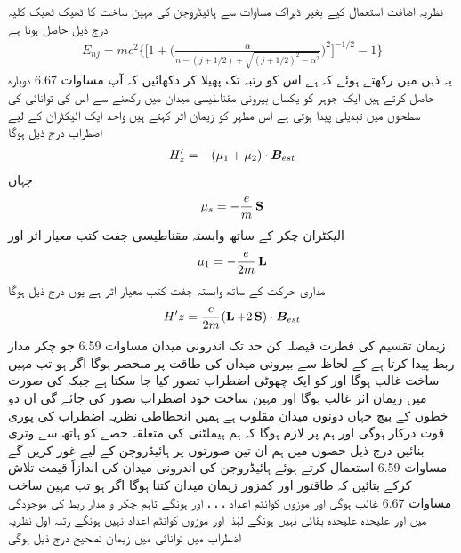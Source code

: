نظریہ اضافت استعمال کیے بغیر ڈیراک مساوات سے ہائیڈروجن کی مہین ساخت کا ٹھیک ٹھیک کلیہ درج ذیل حاصل ہوتا ہے 
\begin{align*}
E_{nj} = mc^2 \big \{ \big [ 1 + \big ( \frac{\alpha}{n - (j + 1/2 ) + \sqrt{(j +1/2)^2 - \alpha^2}} \big )^2 \big ]^{- 1/2} -1 \big \}
\end{align*}
یہ ذہن میں رکھتے ہوئے کہ  ہے اس کو  رتبہ تک پھیلا کر دکھائیں کہ آپ مساوات 6.67 دوبارہ حاصل کرتے ہیں 
ایک جوہر کو یکساں بیرونی مقناطیسی میدان  میں رکھنے سے اس کی توانائی کی سطحوں  میں تبدیلی پیدا ہوتی ہے اس مظہر کو زیمان اثر کہتے ہیں واحد ایک الیکٹران کے لیے اضطراب درج ذیل ہوگا 
\begin{align} 
H'_z = - (\mu_1 + \mu_2) \cdot {\ensuremath{{\boldsymbol{B}}}}_{est}
\end{align}
جہاں 
\begin{align}
\mu_s = - \frac{e}{m} \operatorname{\mathbf{S}}
\end{align}
الیکٹران چکر کے ساتھ وابستہ مقناطیسی جفت کتب معیار اثر اور 
\begin{align} 
\mu_1 = - \frac{e}{2m} \operatorname{\mathbf{L}}
\end{align}
مداری حرکت کے ساتھ وابستہ جفت کتب معیار اثر ہے یوں  درج ذیل ہوگا 
\begin{align}
H'z = \frac{e}{2m} (\operatorname{\mathbf{L}} + 2 \operatorname{\mathbf{S}}) \cdot {\ensuremath{{\boldsymbol{B}}}}_{est}
\end{align}
زیمان تقسیم کی فطرت فیصلہ کن حد تک اندرونی میدان مساوات 6.59 جو چکر مدار ربط پیدا کرتا ہے کے لحاظ سے بیرونی میدان کی طاقت پر منحصر ہوگا اگر   ہو تب مہین ساخت غالب ہوگا اور  کو ایک چھوٹی اضطراب تصور کیا جا سکتا ہے جبکہ  کی صورت میں زیمان  اثر غالب ہوگا اور مہین ساخت خود اضطراب تصور کی جائے گی ان دو خطوں کے بیچ جہاں دونوں میدان  مقلوب  ہے ہمیں انحطاطی نظریہ اضطراب کی پوری قوت درکار ہوگی اور ہم پر  لازم ہوگا کہ ہم ہیملٹنی کی متعلقہ حصے کو ہاتھ سے وتری بنائیں درج ذیل حصوں میں ہم ان تین صورتوں پر ہائیڈروجن کے لیے غور کریں گے 
مساوات 6.59 استعمال کرتے ہوئے ہائیڈروجن کی اندرونی میدان کی اندازاً  قیمت تلاش کرکے بتائیں  کہ  طاقتور اور کمزور زیمان میدان کتنا ہوگا 
اگر  ہو تب مہین ساخت مساوات 6.67 غالب ہوگی اور موزوں کوانٹم اعداد ، ، ، اور  ہونگے تاہم چکر و مدار ربط کی موجودگی میں  اور  علیحدہ علیحدہ بقائی نہیں ہونگے لہٰذا  اور  موزوں کوانٹم اعداد نہیں ہونگے رتبہ اول نظریہ اضطراب میں توانائی میں زیمان تصحیح درج ذیل ہوگی 
